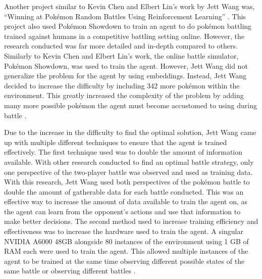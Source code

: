 Another project similar to Kevin Chen and Elbert Lin's work by Jett Wang was, ``Winning at Pokémon Random Battles Using Reinforcement Learning'' \cite{wang2020winning}. This project also used Pokémon Showdown to train an agent to do pokémon battling trained against humans in a competitive battling setting online. However, the research conducted was far more detailed and in-depth compared to others. Similarly to Kevin Chen and Elbert Lin's work, the online battle simulator, Pokémon Showdown, was used to train the agent. However, Jett Wang did not generalize the problem for the agent by using embeddings. Instead, Jett Wang decided to increase the difficulty by including 342 more pokémon within the environment. This greatly increased the complexity of the problem by adding many more possible pokémon the agent must become accustomed to using during battle \cite{wang2020winning}. 

Due to the increase in the difficulty to find the optimal solution, Jett Wang came up with multiple different techniques to ensure that the agent is trained effectively. The first technique used was to double the amount of information available. With other research conducted to find an optimal battle strategy, only one perspective of the two-player battle was observed and used as training data. With this research, Jett Wang used both perspectives of the pokémon battle to double the amount of gatherable data for each battle conducted. This was an effective way to increase the amount of data available to train the agent on, as the agent can learn from the opponent's actions and use that information to make better decisions. The second method used to increase training efficiency and effectiveness was to increase the hardware used to train the agent. A singular NVIDIA A6000 48GB alongside 80 instances of the environment using 1 GB of RAM each were used to train the agent. This allowed multiple instances of the agent to be trained at the same time observing different possible states of the same battle or observing different battles \cite{wang2020winning}. 
 
